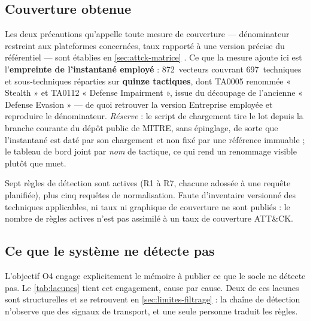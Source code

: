 \subsection{Couverture obtenue}

Les deux précautions qu'appelle toute mesure de couverture --- dénominateur restreint aux
plateformes concernées, taux rapporté à une version précise du référentiel --- sont établies en
\cref{sec:attck-matrice} \cite{mitre_attack,mitre_attack_design2018}. Ce que la mesure ajoute ici
est l'\textbf{empreinte de l'instantané employé} : 872~vecteurs couvrant 697~techniques et
sous-techniques réparties sur \textbf{quinze tactiques}, dont TA0005 renommée « Stealth » et TA0112
« Defense Impairment », issue du découpage de l'ancienne « Defense Evasion » --- de quoi retrouver
la version Entreprise employée et reproduire le dénominateur. \emph{Réserve} : le script de
chargement tire le lot depuis la branche courante du dépôt public de MITRE, sans épinglage, de
sorte que l'instantané est daté par son chargement et non fixé par une référence immuable ; le
tableau de bord joint par \emph{nom} de tactique, ce qui rend un renommage visible plutôt que
muet.

Sept règles de détection sont actives (R1 à R7, chacune adossée à une requête planifiée), plus
cinq requêtes de normalisation. Faute d'inventaire versionné des techniques applicables, ni taux
ni graphique de couverture ne sont publiés : le nombre de règles actives n'est pas assimilé à un
taux de couverture ATT\&CK.

\subsection{Ce que le système ne détecte pas}

L'objectif O4 engage explicitement le mémoire à publier ce que le socle ne détecte pas. Le
\cref{tab:lacunes} tient cet engagement, cause par cause. Deux de ces lacunes sont
structurelles et se retrouvent en \cref{sec:limites-filtrage} : la chaîne de détection
n'observe que des signaux de transport, et une seule personne traduit les règles.

